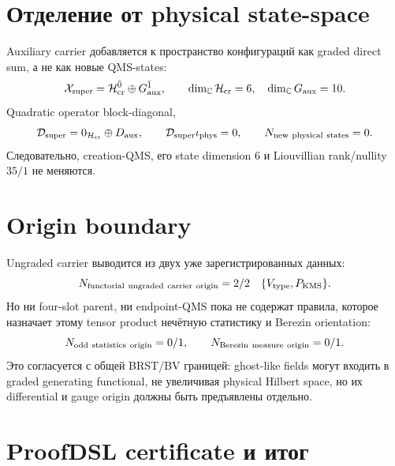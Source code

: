 \section{Отделение от physical state-space}

Auxiliary carrier добавляется к пространство конфигураций как graded direct sum,
а не как новые QMS-states:
\begin{equation}
 \mathcal X_{\rm super}
 =\mathcal H_{\rm cr}^{\bar0}\oplus G_{\rm aux}^{\bar1},
 \qquad
 \dim_{\mathbb C}\mathcal H_{\rm cr}=6,\quad
 \dim_{\mathbb C}G_{\rm aux}=10.
 \label{eq:v9-kms-aux-fermion-superconfiguration}
\end{equation}
Quadratic operator block-diagonal,
\begin{equation}
 \mathcal D_{\rm super}=0_{\mathcal H_{\rm cr}}\oplus D_{\rm aux},
 \qquad
 \mathcal D_{\rm super}\iota_{\rm phys}=0,
 \qquad N_{\rm new\ physical\ states}=0.
 \label{eq:v9-kms-aux-fermion-decoupling}
\end{equation}
Следовательно, creation-QMS, его state dimension $6$ и Liouvillian
rank/nullity $35/1$ не меняются.

\section{Origin boundary}

Ungraded carrier выводится из двух уже зарегистрированных данных:
\begin{equation}
 N_{\rm functorial\ ungraded\ carrier\ origin}=2/2
 \quad\{V_{\rm type},P_{\rm KMS}\}.
 \label{eq:v9-kms-aux-fermion-ungraded-origin}
\end{equation}
Но ни four-slot parent, ни endpoint-QMS пока не содержат правила, которое
назначает этому tensor product нечётную статистику и Berezin orientation:
\begin{equation}
 N_{\rm odd\ statistics\ origin}=0/1,
 \qquad
 N_{\rm Berezin\ measure\ origin}=0/1.
 \label{eq:v9-kms-aux-fermion-statistics-origin}
\end{equation}
Это согласуется с общей BRST/BV границей: ghost-like fields могут входить
в graded generating functional, не увеличивая physical Hilbert space, но
их differential и gauge origin должны быть предъявлены отдельно.

\section{ProofDSL certificate и итог}

